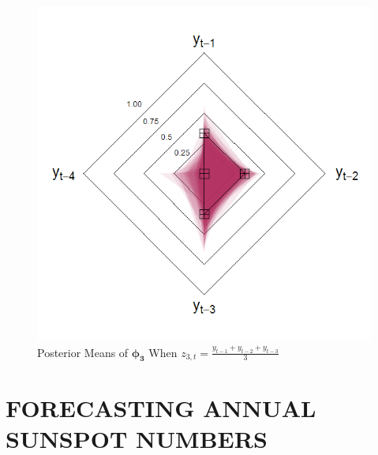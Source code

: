\begin{figure}[!h]
\begin{minipage}[h]{0.3\textwidth}
\end{minipage}
\begin{minipage}[h]{0.8\textwidth}
\caption{Posterior Means of $\bm{\phi_3}$ When $z_{3,t}=\frac{y_{t-1}+y_{t-2}+y_{t-3}}{3}$}
\label{fig:th3}
\center
\includegraphics[scale=0.29]{hsthvar3}
\end{minipage}
\end{figure}




\section{FORECASTING ANNUAL SUNSPOT NUMBERS}

